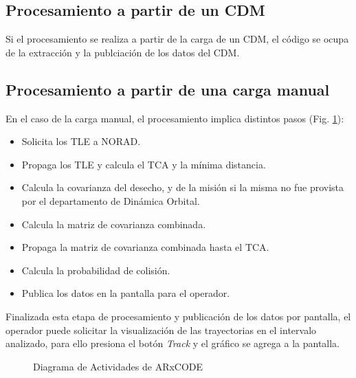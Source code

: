 \subsection*{Procesamiento a partir de un CDM}
Si el procesamiento se realiza a partir de la carga de un CDM, el c\'odigo se ocupa de la extracci\'on y la publciaci\'on de los datos del CDM. 
\subsection*{Procesamiento a partir de una carga manual}
En el caso de la carga manual, el procesamiento implica distintos pasos (Fig. \ref{fig:actdiag}):
\begin{itemize}
 \item Solicita los TLE a NORAD.
 \item Propaga los TLE y calcula el TCA y la m\'inima distancia.
 \item Calcula la covarianza del desecho, y de la misi\'on si la misma no fue provista por el departamento de Din\'amica Orbital.
 \item Calcula la matriz de covarianza combinada.
 \item Propaga la matriz de covarianza combinada hasta el TCA.
 \item Calcula la probabilidad de colisi\'on.
 \item Publica los datos en la pantalla para el operador.
\end{itemize}

Finalizada esta etapa de procesamiento y publicaci\'on de los datos por pantalla, el operador puede solicitar la visualizaci\'on de las trayectorias en el intervalo analizado, para ello presiona el bot\'on {\it{Track}} y el gr\'afico se agrega a la pantalla.\\

\begin{figure}[h!]
  \centering
  \caption{Diagrama de Actividades de ARxCODE}
  \label{fig:actdiag}
\end{figure}

